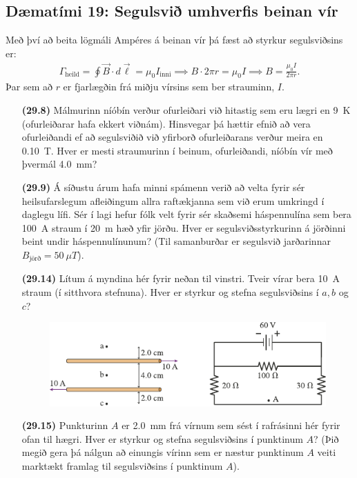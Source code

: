 \ifdefined \wholebook \else\documentclass[oneside]{book}\usepackage{EdlBook}\graphicspath{{figures/}}
\begin{document}
\newpage


\subsection*{Dæmatími 19: Segulsvið umhverfis beinan vír}

\begin{tcolorbox}
Með því að beita lögmáli Ampéres á beinan vír þá fæst að styrkur segulsviðsins er:
\begin{align*}
    \Gamma_{\text{heild}} = \oint \vec{B} \cdot d \vec{\ell} = \mu_0 I_{\text{inni}} \implies B \cdot 2\pi r = \mu_0 I \implies B = \frac{\mu_0 I}{2\pi r}.
\end{align*}
Þar sem að $r$ er fjarlægðin frá miðju vírsins sem ber strauminn, $I$.
\end{tcolorbox}

\begin{enumerate}[label = \textbf{(\alph*)}]

\item[\textbf{(29.8)}] Málmurinn níóbín verður ofurleiðari við hitastig sem eru lægri en \SI{9}{K} (ofurleiðarar hafa ekkert viðnám). Hinsvegar þá hættir efnið að vera ofurleiðandi ef að segulsviðið við yfirborð ofurleiðarans verður meira en \SI{0.10}{T}. Hver er mesti straumurinn í beinum, ofurleiðandi, níóbín vír með þvermál \SI{4.0}{mm}?

\item[\textbf{(29.9)}]  Á síðustu árum hafa minni spámenn verið að velta fyrir sér heilsufarslegum afleiðingum allra raftækjanna sem við erum umkringd í daglegu lífi. Sér í lagi hefur fólk velt fyrir sér skaðsemi háspennulína sem bera \SI{100}{A} straum í \SI{20}{m} hæð yfir jörðu. Hver er segulsviðsstyrkurinn á jörðinni beint undir háspennulínunum? (Til samanburðar er segulsvið jarðarinnar $B_{\text{jörð}} = \SI{50}{\mu T}$).

\item[\textbf{(29.14)}] Lítum á myndina hér fyrir neðan til vinstri. Tveir vírar bera \SI{10}{A} straum (í sitthvora stefnuna). Hver er styrkur og stefna segulsviðsins í $a, b$ og $c$?

\begin{figure}[H]
    \centering
    \includegraphics[scale = 1.25]{figures/rk2914.pdf}
\end{figure}

\item[\textbf{(29.15)}] Punkturinn $A$ er \SI{2.0}{mm} frá vírnum sem sést í rafrásinni hér fyrir ofan til hægri. Hver er styrkur og stefna segulsviðsins í punktinum $A$? (Þið megið gera þá nálgun að einungis vírinn sem er næstur punktinum $A$ veiti marktækt framlag til segulsviðsins í punktinum $A$).

\end{enumerate}
\end{document}
